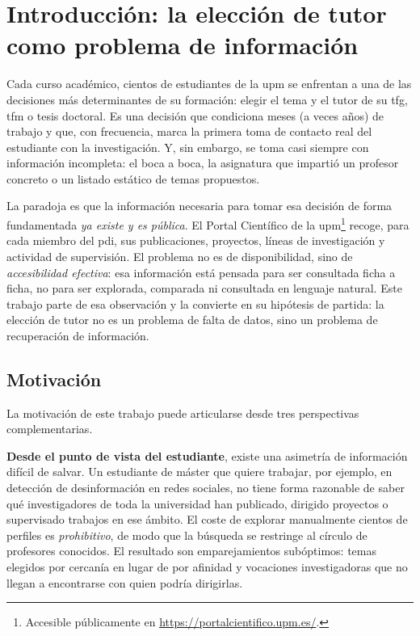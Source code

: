 \chapter[Introducción]{Introducción: la elección de tutor como problema de información}
\label{ch:introduccion}

Cada curso académico, cientos de estudiantes de la \gls{upm} se enfrentan a una de las decisiones más determinantes de su formación: elegir el tema y el tutor de su \gls{tfg}, \gls{tfm} o tesis doctoral.
Es una decisión que condiciona meses (a veces años) de trabajo y que, con frecuencia, marca la primera toma de contacto real del estudiante con la investigación.
Y, sin embargo, se toma casi siempre con información incompleta: el boca a boca, la asignatura que impartió un profesor concreto o un listado estático de temas propuestos.

La paradoja es que la información necesaria para tomar esa decisión de forma fundamentada \emph{ya existe y es pública}.
El Portal Científico de la \gls{upm}\footnote{Accesible públicamente en \url{https://portalcientifico.upm.es/}.} recoge, para cada miembro del \gls{pdi}, sus publicaciones, proyectos, líneas de investigación y actividad de supervisión.
El problema no es de disponibilidad, sino de \emph{accesibilidad efectiva}: esa información está pensada para ser consultada ficha a ficha, no para ser explorada, comparada ni consultada en lenguaje natural.
Este trabajo parte de esa observación y la convierte en su hipótesis de partida: la elección de tutor no es un problema de falta de datos, sino un problema de recuperación de información.

\section{Motivación}
\label{sec:motivacion}

La motivación de este trabajo puede articularse desde tres perspectivas complementarias.

\textbf{Desde el punto de vista del estudiante}, existe una asimetría de información difícil de salvar.
Un estudiante de máster que quiere trabajar, por ejemplo, en detección de desinformación en redes sociales, no tiene forma razonable de saber qué investigadores de toda la universidad han publicado, dirigido proyectos o supervisado trabajos en ese ámbito.
El coste de explorar manualmente cientos de perfiles es \emph{prohibitivo}, de modo que la búsqueda se restringe al círculo de profesores conocidos.
El resultado son emparejamientos subóptimos: temas elegidos por cercanía en lugar de por afinidad y vocaciones investigadoras que no llegan a encontrarse con quien podría dirigirlas.

